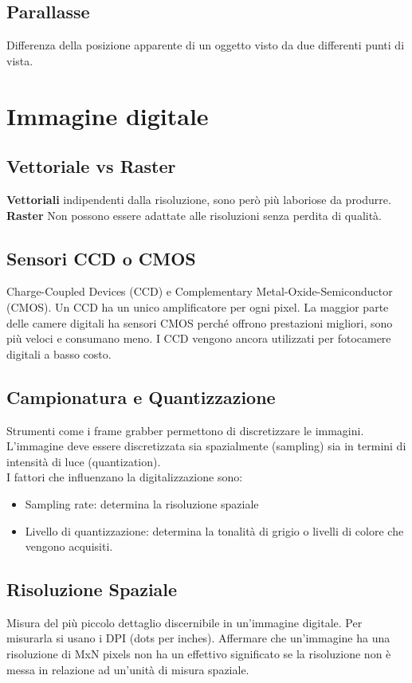 \documentclass[8pt,a4paper]{article}
\begin{document}
\begin{multicols}{5}
    \subsection{Parallasse}
    Differenza della posizione apparente di un oggetto visto da due differenti punti di 
    vista.

    \section{Immagine digitale}
    \subsection{Vettoriale vs Raster}
    \textbf{Vettoriali} indipendenti dalla risoluzione, sono però più laboriose da 
    produrre. \\
    \textbf{Raster} Non possono essere adattate alle risoluzioni senza perdita di qualità.
    \subsection{Sensori CCD o CMOS}
    Charge-Coupled Devices (CCD) e Complementary Metal-Oxide-Semiconductor (CMOS).
    Un CCD ha un unico amplificatore per ogni pixel.
    La maggior parte delle camere digitali ha sensori CMOS
    perché offrono prestazioni migliori, sono più veloci e consumano meno. 
    I CCD vengono ancora utilizzati per fotocamere digitali a basso costo.

    \subsection{Campionatura e Quantizzazione}
    Strumenti come i frame grabber permettono di discretizzare le immagini.
    L'immagine deve essere discretizzata sia spazialmente (sampling)
    sia in termini di intensità di luce (quantization). \\
    I fattori che influenzano la digitalizzazione sono:
    \begin{itemize}
      \item Sampling rate: determina la risoluzione spaziale
      \item Livello di quantizzazione: determina la tonalità di grigio o livelli
        di colore che vengono acquisiti. 
    \end{itemize}

    \subsection{Risoluzione Spaziale}
    Misura del più piccolo dettaglio discernibile in un'immagine digitale.
    Per misurarla si usano i DPI (dots per inches). Affermare che un'immagine ha una
    risoluzione di MxN pixels non ha un effettivo significato se la risoluzione non è 
    messa in relazione ad un'unità di misura spaziale.


\end{multicols}
\end{document}
